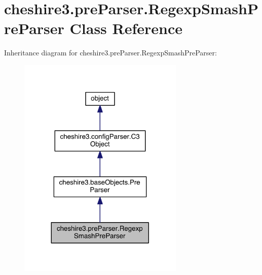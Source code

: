 \hypertarget{classcheshire3_1_1pre_parser_1_1_regexp_smash_pre_parser}{\section{cheshire3.\-pre\-Parser.\-Regexp\-Smash\-Pre\-Parser Class Reference}
\label{classcheshire3_1_1pre_parser_1_1_regexp_smash_pre_parser}
}


Inheritance diagram for cheshire3.\-pre\-Parser.\-Regexp\-Smash\-Pre\-Parser\-:
\nopagebreak
\begin{figure}[H]
\begin{center}
\leavevmode
\includegraphics[width=224pt]{classcheshire3_1_1pre_parser_1_1_regexp_smash_pre_parser__inherit__graph}
\end{center}
\end{figure}


